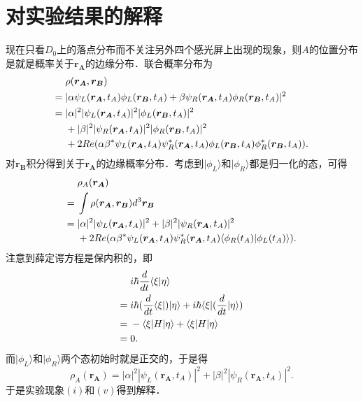 \section{对实验结果的解释}
现在只看$D_0$上的落点分布而不关注另外四个感光屏上出现的现象，则$A$的位置分布是就是概率关于$\boldsymbol{r_A}$的边缘分布．联合概率分布为
\begin{align}
&\rho(\boldsymbol{r_A},\boldsymbol{r_B}) \notag \\
={}&|\alpha\psi_L(\boldsymbol{r_A},t_A)\phi_L(\boldsymbol{r_B},t_A)+\beta\psi_R(\boldsymbol{r_A},t_A)\phi_R(\boldsymbol{r_B},t_A)|^2 \notag \\
={}&|\alpha|^2|\psi_L(\boldsymbol{r_A},t_A)|^2|\phi_L(\boldsymbol{r_B},t_A)|^2 \notag \\
&+|\beta|^2|\psi_R(\boldsymbol{r_A},t_A)|^2|\phi_R(\boldsymbol{r_B},t_A)|^2 \notag \\
&+2Re(\alpha\beta^*\psi_L(\boldsymbol{r_A},t_A)\psi_R^*(\boldsymbol{r_A},t_A)\phi_L(\boldsymbol{r_B},t_A)\phi_R^*(\boldsymbol{r_B},t_A)).
\label{eq:联合概率分布}
\end{align}
对$\boldsymbol{r_B}$积分得到关于$\boldsymbol{r_A}$的边缘概率分布．考虑到$|\phi_L\rangle$和$|\phi_R\rangle$都是归一化的态，可得
\begin{align}
&\rho_A(\boldsymbol{r_A}) \notag \\
={}&\int \rho(\boldsymbol{r_A},\boldsymbol{r_B})d^3\boldsymbol{r_B} \notag \\
={}&|\alpha|^2|\psi_L(\boldsymbol{r_A},t_A)|^2+|\beta|^2|\psi_R(\boldsymbol{r_A},t_A)|^2 \notag \\
&+2Re(\alpha\beta^*\psi_L(\boldsymbol{r_A},t_A)\psi_R^*(\boldsymbol{r_A},t_A)\langle\phi_R(t_A)|\phi_L(t_A)\rangle).
\end{align}
注意到薛定谔方程是保内积的，即
\begin{align}
&i\hbar\frac{d}{dt}\langle\xi|\eta\rangle \notag \\
={}&i\hbar(\frac{d}{dt}\langle\xi|)|\eta\rangle+i\hbar\langle\xi|(\frac{d}{dt}|\eta\rangle) \notag \\
={}&-\langle\xi|H|\eta\rangle+\langle\xi|H|\eta\rangle \notag \\
={}&0.
\end{align}
而$|\phi_L\rangle$和$|\phi_R\rangle$两个态初始时就是正交的，于是得
\begin{equation}
\rho_A(\boldsymbol{r_A})=|\alpha|^2|\psi_L(\boldsymbol{r_A},t_A)|^2+|\beta|^2|\psi_R(\boldsymbol{r_A},t_A)|^2.
\label{eq:A边缘分布}
\end{equation}
于是实验现象$(i)$和$(v)$得到解释．

